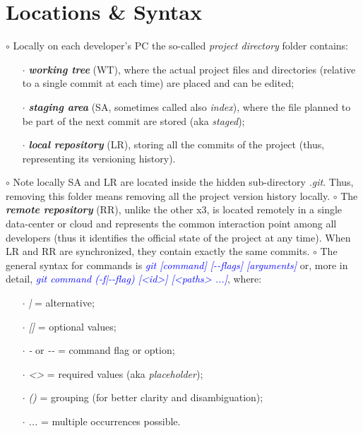 \documentclass[a4paper,portrait,10pt]{article}   %
\newcommand{\mycmd}[1]{\textcolor{blue}{\textit{#1}}}   %
\begin{document}
\section{Locations \& Syntax}
$\circ$ Locally on each developer's PC the so-called \textit{project directory} folder contains:
\begin{itemize}
  \item[$\cdot$] \textbf{\textit{working tree}} (WT), where the actual project files and directories (relative to a single commit at each time) are placed and can be edited;
  \item[$\cdot$] \textbf{\textit{staging area}} (SA, sometimes called also \textit{index}), where the file planned to be part of the next commit are stored (aka \textit{staged});
  \item[$\cdot$] \textbf{\textit{local repository}} (LR), storing all the commits of the project (thus, representing its versioning history).
\end{itemize}
\vspace{5pt}
$\circ$ Note locally SA and LR are located inside the hidden sub-directory \textit{.git}. Thus, removing this folder means removing all the project version history locally.
\newline
\newline
$\circ$ The \textbf{\textit{remote repository}} (RR), unlike the other x3, is located remotely in a single data-center or cloud and represents the common interaction point among all developers (thus it identifies the official state of the project at any time). When LR and RR are synchronized, they contain exactly the same commits.
\newline
\newline
$\circ$ The general syntax for commands is \mycmd{git [command] [-{}-flags] [arguments]} or, more in detail, \mycmd{git command (-f|-{}-flag) [<id>] [<paths> ...]}, where:
\begin{itemize}
  \item[$\cdot$] \textit{|} = alternative;
  \item[$\cdot$] \textit{[]} = optional values;
  \item[$\cdot$] \textit{-} or \textit{-{}-} = command flag or option;
  \item[$\cdot$] \textit{<>} = required values (aka \textit{placeholder});
  \item[$\cdot$] \textit{()} = grouping (for better clarity and disambiguation);
  \item[$\cdot$] \textit{...} = multiple occurrences possible.
\end{itemize}
\end{document}
